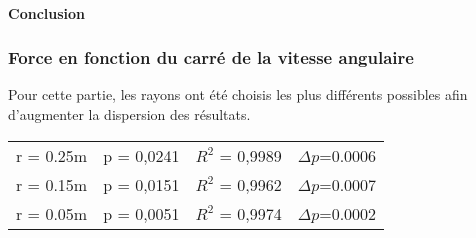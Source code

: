 \paragraph{Conclusion}

\newpage
\subsubsection{Force en fonction du carré de la vitesse angulaire}

Pour cette partie, les rayons ont été choisis les plus différents possibles afin d'augmenter la dispersion des résultats.

\begin{table}[ht]
    \centering
    \begin{tabular}{l l l l}
    r = 0.25m & p = 0,0241 & $R^2$ = 0,9989& $\Delta p$=0.0006\\
    r = 0.15m & p = 0,0151 & $R^2$ = 0,9962& $\Delta p$=0.0007\\
    r = 0.05m & p = 0,0051 & $R^2$ = 0,9974& $\Delta p$=0.0002\\
    \end{tabular}
\end{table}

